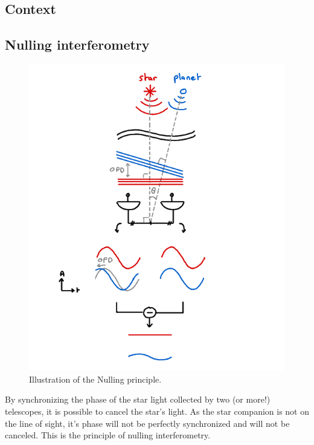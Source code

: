 \documentclass[isoft]{ufgtexposter}
\begin{document}
\begin{poster}
        
    \section{Context}%
        
        \subsection{Nulling interferometry}

            \begin{figure}
                \centering
                \captionsetup{type=figure}
                \includegraphics[scale=1.5]{images/nuller_scheme.png}
                \caption{Illustration of the Nulling principle.}
                \label{fig:nulling_principle}
            \end{figure}
        
            By synchronizing the phase of the star light collected by two (or more!) telescopes, it is possible to cancel the star's light. As the star companion is not on the line of sight, it's phase will not be perfectly synchronized and will not be canceled. This is the principle of nulling interferometry.
    

\end{poster}
\end{document}
